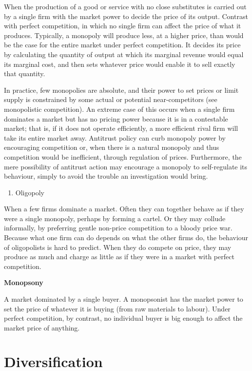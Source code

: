\documentclass[11pt,]{book}
\providecommand{\tightlist}{%
  \setlength{\itemsep}{0pt}\setlength{\parskip}{0pt}}
\theoremstyle{definition}
\theoremstyle{definition}
\theoremstyle{definition}
\theoremstyle{remark}
\begin{document}
When the production of a good or service with no close substitutes is
carried out by a single firm with the market power to decide the price
of its output. Contrast with perfect competition, in which no single
firm can affect the price of what it produces. Typically, a monopoly
will produce less, at a higher price, than would be the case for the
entire market under perfect competition. It decides its price by
calculating the quantity of output at which its marginal revenue would
equal its marginal cost, and then sets whatever price would enable it to
sell exactly that quantity.

In practice, few monopolies are absolute, and their power to set prices
or limit supply is constrained by some actual or potential
near-competitors (see monopolistic competition). An extreme case of this
occurs when a single firm dominates a market but has no pricing power
because it is in a contestable market; that is, if it does not operate
efficiently, a more efficient rival firm will take its entire market
away. Antitrust policy can curb monopoly power by encouraging
competition or, when there is a natural monopoly and thus competition
would be inefficient, through regulation of prices. Furthermore, the
mere possibility of antitrust action may encourage a monopoly to
self-regulate its behaviour, simply to avoid the trouble an
investigation would bring.

\begin{enumerate}
\def\labelenumi{\arabic{enumi}.}
\setcounter{enumi}{3}
\tightlist
\item
  Oligopoly
\end{enumerate}

When a few firms dominate a market. Often they can together behave as if
they were a single monopoly, perhaps by forming a cartel. Or they may
collude informally, by preferring gentle non-price competition to a
bloody price war. Because what one firm can do depends on what the other
firms do, the behaviour of oligopolists is hard to predict. When they do
compete on price, they may produce as much and charge as little as if
they were in a market with perfect competition.

\textbf{Monopsony}

A market dominated by a single buyer. A monopsonist has the market power
to set the price of whatever it is buying (from raw materials to
labour). Under perfect competition, by contrast, no individual buyer is
big enough to affect the market price of anything.

\section{Diversification}\label{diversification}
\end{document}
